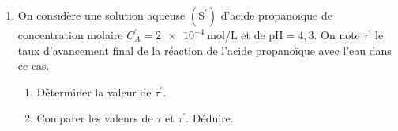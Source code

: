 \begin{enumerate}
    \item On considère une solution aqueuse $(\mathrm{S^{\prime}})$ d'acide
          propanoïque de concentration molaire
          $C_{A}^{\prime}=\qty{2e-4}{\mol\per\L}$ et de $\mathrm{pH}=4,3$. On
          note $\tau^{\prime}$ le taux d'avancement final de la réaction de
          l'acide propanoïque avec l'eau dans ce cas.
          \begin{enumerate}
              \item Déterminer la valeur de $\tau^{\prime}$.
              \item Comparer les valeurs de $\tau$ et $\tau^{\prime}$. Déduire.
          \end{enumerate}
\end{enumerate}


